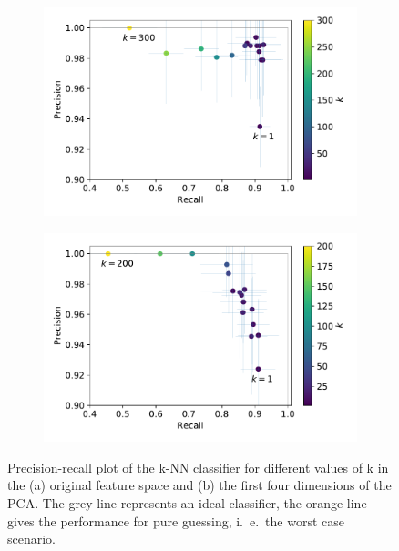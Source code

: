 \documentclass[12pt, a4paper]{scrartcl}
\begin{document}
\begin{figure}
	\centering
	 \begin{subfigure}[b]{0.45\textwidth}
	 	\includegraphics[width=\textwidth]{knn}
	 	\caption{}
	 	\label{fig:knn1}
    \end{subfigure}
	 \begin{subfigure}[b]{0.45\textwidth}
	 	\includegraphics[width=\textwidth]{knn_pca}
	 	\caption{}
	 	\label{fig:knn2}
    \end{subfigure}
	\caption{Precision-recall plot of the k-NN classifier for different values of k in the (a) original feature space and (b) the first four dimensions of the PCA. The grey line represents an ideal classifier, the orange line gives the performance for pure guessing, i.\ e.\ the worst case scenario.}
	\label{fig:knn}
\end{figure}
\end{document}
